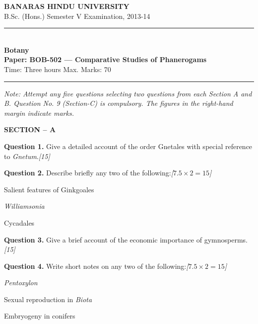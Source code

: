 \documentclass[11pt,a4paper]{article}
\newcommand{\pts}[1]{\hfill   \textit{[#1]}}
\begin{document}
\begin{center}
  {\large\bfseries BANARAS HINDU UNIVERSITY}\\[2pt]
  {\normalsize B.Sc. (Hons.) Semester V Examination, 2013-14}\\[6pt]
  \rule{0.8\linewidth}{0.5pt}\\[6pt]
  {\large\bfseries Botany}\\[4pt]
  {\large\bfseries Paper: BOB-502 --- Comparative Studies of Phanerogams}\\[4pt]
  {\normalsize Time: Three hours \hfill Max. Marks: 70}
\end{center}

\rule{\linewidth}{0.4pt}

\smallskip



\noindent   \textit{Note: Attempt any five questions selecting two questions from each Section A and B. Question No. 9 (Section-C) is compulsory. The figures in the right-hand margin indicate marks.}

\bigskip

\begin{center}
   \textbf{SECTION -- A}
\end{center}

\medskip


\noindent   \textbf{Question 1.} Give a detailed account of the order Gnetales with special reference to   \textit{Gnetum}.\pts{15}

\medskip


\noindent   \textbf{Question 2.} Describe briefly any two of the following:\pts{$7.5  \times 2 = 15$}

\begin{parts}
  \item Salient features of Ginkgoales
  \item   \textit{Williamsonia}
  \item Cycadales
\end{parts}

\medskip


\noindent   \textbf{Question 3.} Give a brief account of the economic importance of gymnosperms.\pts{15}

\medskip


\noindent   \textbf{Question 4.} Write short notes on any two of the following:\pts{$7.5  \times 2 = 15$}

\begin{parts}
  \item   \textit{Pentoxylon}
  \item Sexual reproduction in   \textit{Biota}
  \item Embryogeny in conifers
\end{parts}
\end{document}
